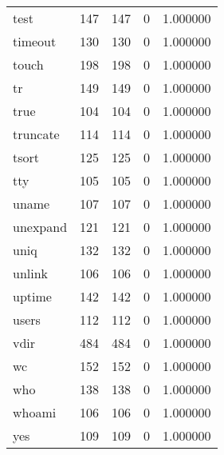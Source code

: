 \begin{longtable}{lrrrr}
test      &                     147 &              147 &                 0 &                     1.000000 \\
timeout   &                     130 &              130 &                 0 &                     1.000000 \\
touch     &                     198 &              198 &                 0 &                     1.000000 \\
tr        &                     149 &              149 &                 0 &                     1.000000 \\
true      &                     104 &              104 &                 0 &                     1.000000 \\
truncate  &                     114 &              114 &                 0 &                     1.000000 \\
tsort     &                     125 &              125 &                 0 &                     1.000000 \\
tty       &                     105 &              105 &                 0 &                     1.000000 \\
uname     &                     107 &              107 &                 0 &                     1.000000 \\
unexpand  &                     121 &              121 &                 0 &                     1.000000 \\
uniq      &                     132 &              132 &                 0 &                     1.000000 \\
unlink    &                     106 &              106 &                 0 &                     1.000000 \\
uptime    &                     142 &              142 &                 0 &                     1.000000 \\
users     &                     112 &              112 &                 0 &                     1.000000 \\
vdir      &                     484 &              484 &                 0 &                     1.000000 \\
wc        &                     152 &              152 &                 0 &                     1.000000 \\
who       &                     138 &              138 &                 0 &                     1.000000 \\
whoami    &                     106 &              106 &                 0 &                     1.000000 \\
yes       &                     109 &              109 &                 0 &                     1.000000 \\
\end{longtable}
